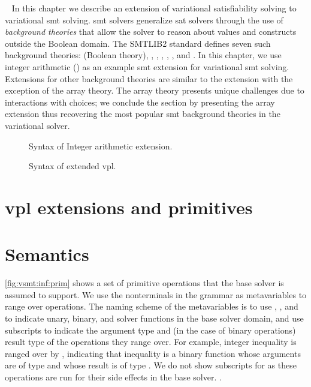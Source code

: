~\label{chapter:vsmt}
%
In this chapter we describe an extension of variational satisfiability solving
to variational \ac{smt} solving.
\ac{smt} solvers generalize \ac{sat} solvers through the use of \emph{background
  theories} that allow the solver to reason about values and constructs outside
the Boolean domain. The SMTLIB2 standard defines seven such background theories:
 (Boolean theory), , ,
, , , and . In this chapter,
we use integer arithmetic () as an example \ac{smt} extension for
variational \ac{smt} solving. Extensions for other background theories are
similar to the  extension with the exception of the array theory. The
array theory presents unique challenges due to interactions with choices; we
conclude the section by presenting the array extension thus recovering the most
popular \ac{smt} background theories in the variational solver.

\begin{figure}
  \centering
  
  \caption{Syntax of Integer arithmetic extension.}%
  \label{fig:arith:stx}
\end{figure}
%
\begin{figure}

\centering
\caption{Syntax of extended \ac{vpl}.}%
\label{fig:arith:vpl}
\end{figure}

\section{\ac{vpl} extensions and primitives}


\section{Semantics}
%
\autoref{fig:vsmt:inf:prim} shows a set of primitive operations that the base
solver is assumed to support. We use the nonterminals in the grammar as
metavariables to range over operations. The naming scheme of the metavariables
is to use \uop{}, \bop{}, and \sop{} to indicate unary, binary, and solver
functions in the base solver domain, and use subscripts to indicate the
argument type and (in the case of binary operations) result type of the
operations they range over.
%
For example, integer inequality is ranged over by \bib{}, indicating that
inequality is a binary function whose arguments are of type \integers{} and
whose result is of type \booleans{}.
%
We do not show subscripts for \sop{} as these operations are run for their side
effects in the base solver.
%
.

